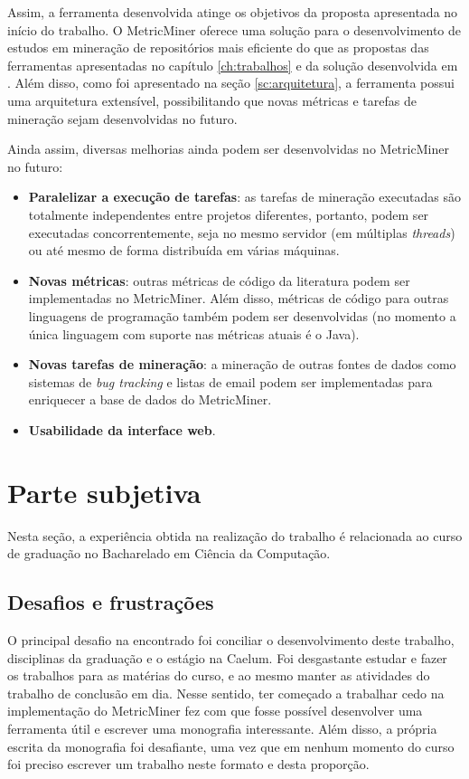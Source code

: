 \documentclass[a4paper, 12pt, twoside]{book}
\begin{document}
        Assim, a ferramenta desenvolvida atinge os objetivos da proposta apresentada no início do trabalho. O MetricMiner oferece uma solução para o desenvolvimento de estudos em mineração de repositórios mais eficiente do que as propostas das ferramentas apresentadas no capítulo \ref{ch:trabalhos} e da solução desenvolvida em \cite{SoetensQUATIC2010}. Além disso, como foi apresentado na seção \ref{sc:arquitetura}, a ferramenta possui uma arquitetura extensível, possibilitando que novas métricas e tarefas de mineração sejam desenvolvidas no futuro.

        Ainda assim, diversas melhorias ainda podem ser desenvolvidas no MetricMiner no futuro:
        \begin{itemize}
            \item {\bf Paralelizar a execução de tarefas}: as tarefas de mineração executadas são totalmente independentes entre projetos diferentes, portanto, podem ser executadas concorrentemente, seja no mesmo servidor (em múltiplas \textit{threads}) ou até mesmo de forma distribuída em várias máquinas.
            \item {\bf Novas métricas}: outras métricas de código da literatura podem ser implementadas no MetricMiner. Além disso, métricas de código para outras linguagens de programação também podem ser desenvolvidas (no momento a única linguagem com suporte nas métricas atuais é o Java).
            \item {\bf Novas tarefas de mineração}: a mineração de outras fontes de dados como sistemas de \textit{bug tracking} e listas de email podem ser implementadas para enriquecer a base de dados do MetricMiner.
            \item {\bf Usabilidade da interface web}.
        \end{itemize}


\chapter{Parte subjetiva} \label{ch:subjetiva}

Nesta seção, a experiência obtida na realização do trabalho é relacionada ao curso de graduação no Bacharelado em Ciência da Computação.

    \section{Desafios e frustrações}
    O principal desafio na encontrado foi conciliar o desenvolvimento deste trabalho, disciplinas da graduação e o estágio na Caelum. Foi desgastante estudar e fazer os trabalhos para as matérias do curso,  e ao mesmo manter as atividades do trabalho de conclusão em dia. Nesse sentido, ter começado a trabalhar cedo na implementação do MetricMiner fez com que fosse possível desenvolver uma ferramenta útil e escrever uma monografia interessante. Além disso, a própria escrita da monografia foi desafiante, uma vez que em nenhum momento do curso foi preciso escrever um trabalho neste formato e desta proporção.
\end{document}
